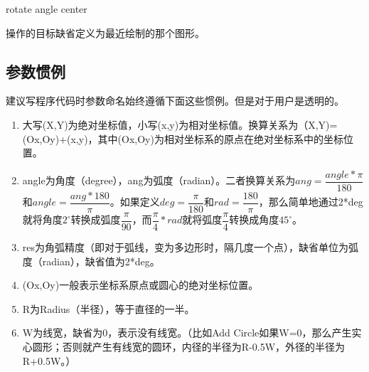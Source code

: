 rotate angle center

操作的目标缺省定义为最近绘制的那个图形。

\subsection{参数惯例} \label{SectCmdConvention} 
建议写程序代码时参数命名始终遵循下面这些惯例。但是对于用户是透明的。
\begin{enumerate}
	\item 大写(X,Y)为绝对坐标值，小写(x,y)为相对坐标值。换算关系为（X,Y)=(Ox,Oy)+(x,y)，其中(Ox,Oy)为相对坐标系的原点在绝对坐标系中的坐标位置。
	\item angle为角度（degree），ang为弧度（radian）。二者换算关系为$ang=\dfrac{angle*\pi}{180}$和$angle=\dfrac{ang*180}{\pi}$。如果定义$deg=\dfrac{\pi}{180}$和$rad=\dfrac{180}{\pi}$，那么简单地通过2*deg就将角度$2^{\circ}$转换成弧度$\dfrac{\pi}{90}$，而$\dfrac{\pi}{4}*rad$就将弧度$\dfrac{\pi}{4}$转换成角度$45^{\circ}$。
	\item res为角弧精度（即对于弧线，变为多边形时，隔几度一个点），缺省单位为弧度（radian），缺省值为2*deg。
	\item (Ox,Oy)一般表示坐标系原点或圆心的绝对坐标位置。
	\item R为Radius（半径），等于直径的一半。
	\item W为线宽，缺省为0，表示没有线宽。（比如Add Circle如果W=0，那么产生实心圆形；否则就产生有线宽的圆环，内径的半径为R-0.5W，外径的半径为R+0.5W。）
\end{enumerate}

